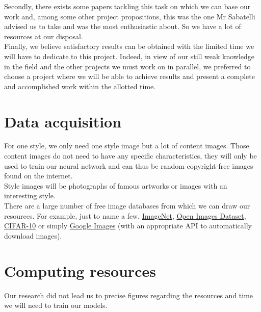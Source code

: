 \documentclass[twocolumn,superscriptaddress,aps]{revtex4-1}
\begin{document}
    Secondly, there exists some papers tackling this task on which we can base our work and, among some other project propositions, this was the one Mr Sabatelli advised us to take and was the most enthusiastic about. So we have a lot of resources at our disposal.\\
    
    Finally, we believe satisfactory results can be obtained with the limited time we will have to dedicate to this project. Indeed, in view of our still weak knowledge in the field and the other projects we must work on in parallel, we preferred to choose a project where we will be able to achieve results and present a complete and accomplished work within the allotted time.
    
    \section{Data acquisition}
    
    For one style, we only need one style image but a lot of content images. Those content images do not need to have any specific characteristics, they will only be used to train our neural network and can thus be random copyright-free images found on the internet.\\
    
    Style images will be photographs of famous artworks or images with an interesting style.\\
    
    There are a large number of free image databases from which we can draw our resources. For example, just to name a few, \textcolor{blue}{\href{http://www.image-net.org}{ImageNet}}, \textcolor{blue}{\href{https://github.com/openimages/dataset}{Open Images Dataset}}, \textcolor{blue}{\href{http://www.cs.toronto.edu/~kriz/cifar.html}{CIFAR-10}} or simply \textcolor{blue}{\href{https://www.google.com/imghp}{Google Images}} (with an appropriate API to automatically download images).
    
    \section{Computing resources}
    
    Our research did not lead us to precise figures regarding the resources and time we will need to train our models.\\
    
\end{document}
